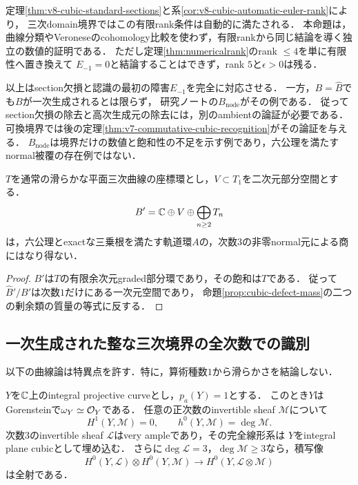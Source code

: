 \documentclass[11pt,a4paper]{ltjsarticle}
\begin{document}
\begin{remark}[有限rank条件の位置]
定理\ref{thm:v8-cubic-standard-sections}と系\ref{cor:v8-cubic-automatic-euler-rank}により，
三次domain境界ではこの有限rank条件は自動的に満たされる．
本命題は，曲線分類やVeroneseのcohomology比較を使わず，有限rankから同じ結論を導く独立の数値的証明である．
ただし定理\ref{thm:numericalrank}のrank $\leq4$を単に有限性へ置き換えて
$E_{-1}=0$と結論することはできず，rank $5$と$\epsilon>0$は残る．
\end{remark}

\begin{remark}[残る生成障害]
以上はsection欠損と認識の最初の障害$E_{-1}$を完全に対応させる．
一方，$B=\widehat B$でも$B$が一次生成されるとは限らず，
研究ノートの$B_{\mathrm{node}}$がその例である．
従ってsection欠損の除去と高次生成元の除去には，別のambientの論証が必要である．
可換境界では後の定理\ref{thm:v7-commutative-cubic-recognition}がその論証を与える．
$B_{\mathrm{node}}$は境界だけの数値と飽和性の不足を示す例であり，六公理を満たすnormal被覆の存在例ではない．
\end{remark}

\begin{corollary}[不均衡なsection欠損によるnormal持上げの障害]\label{cor:cubic-unbalanced-no-lift}
$T$を通常の滑らかな平面三次曲線の座標環とし，$V\subset T_1$を二次元部分空間とする．
\[
 B'=\mathbb C\oplus V\oplus\bigoplus_{n\geq2}T_n
\]
は，六公理とexactな三乗根を満たす軌道環$A$の，次数$3$の非零normal元による商にはなり得ない．
\end{corollary}
\begin{proof}
$B'$は$T$の有限余次元graded部分環であり，その飽和は$T$である．
従って$\widehat B'/B'$は次数$1$だけにある一次元空間であり，
命題\ref{prop:cubic-defect-mass}の二つの剰余類の質量の等式に反する．
\end{proof}

\subsection{一次生成された整な三次境界の全次数での識別}
\label{subsec:cubic-boundary-identification}

以下の曲線論は特異点を許す．特に，算術種数$1$から滑らかさを結論しない．

\begin{lemma}
\label{lem:integral-genus-one-sections}
$Y$を$\mathbb C$上のintegral projective curveとし，$p_a(Y)=1$とする．
このとき$Y$はGorensteinで$\omega_Y\simeq\mathcal O_Y$である．
任意の正次数のinvertible sheaf $\mathcal M$について
\[
 H^1(Y,\mathcal M)=0,\qquad h^0(Y,\mathcal M)=\deg\mathcal M.
\]
次数$3$のinvertible sheaf $\mathcal L$はvery ampleであり，その完全線形系は
$Y$をintegral plane cubicとして埋め込む．
さらに$\deg\mathcal L=3$，$\deg\mathcal M\geq3$なら，積写像
\[
 H^0(Y,\mathcal L)\otimes H^0(Y,\mathcal M)
   \longrightarrow H^0(Y,\mathcal L\otimes\mathcal M)
\]
は全射である．
\end{lemma}
\end{document}
